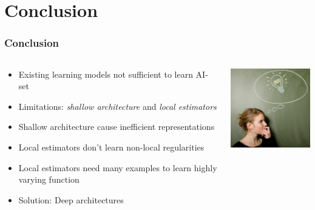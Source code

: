 \section{Conclusion}

\begin{frame}
	\frametitle{Conclusion}
	
	\begin{columns}
		\begin{column}{6.5cm}
			\begin{itemize}
				\item Existing learning models not sufficient to learn AI-set
				\item Limitations: \emph{shallow architecture} and \emph{local estimators}
				\item Shallow architecture cause inefficient representations
				\item Local estimators don't learn non-local regularities
				\item Local estimators need many examples to learn highly varying function
				\item Solution: Deep architectures			
			\end{itemize}
		\end{column}
		\begin{column}{4.5cm}
			\includegraphics[width=4.5cm]{images/bulb.jpg}
		\end{column}
	\end{columns}

\end{frame}

